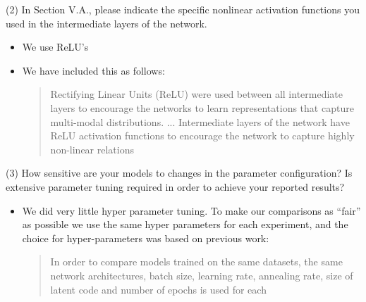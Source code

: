 \documentclass{article}
\begin{document}
{\color{blue}
(2) In Section V.A., please indicate the specific nonlinear activation functions you used in the intermediate layers of the network.}\newline

\begin{itemize}
    \item We use ReLU's
    \item We have included this as follows:
    \begin{quote}
        Rectifying Linear Units (ReLU) were used between all intermediate layers to encourage the networks to learn representations that capture multi-modal distributions. \newline
        ... \newline
        Intermediate layers of the network have ReLU activation functions to encourage the network to capture highly non-linear relations
    \end{quote}
\end{itemize}

{\color{blue}
(3) How sensitive are your models to changes in the parameter configuration? Is extensive parameter tuning required in order to achieve your reported results?}\newline

\begin{itemize}
    \item We did very little hyper parameter tuning. To make our comparisons as ``fair'' as possible we use the same hyper parameters for each experiment, and the choice for hyper-parameters was based on previous work:
    
    \begin{quote}
        In  order  to  compare  models trained on the same datasets, the same network architectures, batch size, learning rate, annealing rate, size of latent code and number of epochs is used for each
    \end{quote}
      
\end{itemize}
\end{document}
